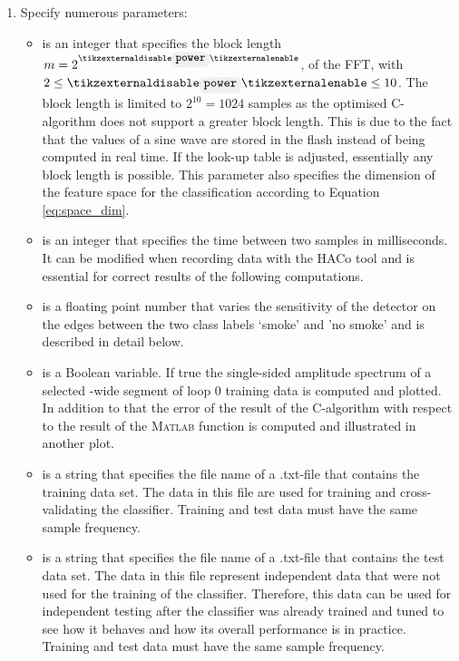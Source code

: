 \begin{enumerate}
\item Specify numerous parameters:

\begin{itemize}

\item {} is an integer that specifies the block length $m = 2^{\small\code{power}}$, of the FFT, with $2 \leq {\code{power}} \leq 10$. The block length is limited to $2^{10} = 1024$ samples as the optimised C-algorithm does not support a greater block length. This is due to the fact that the values of a sine wave are stored in the flash instead of being computed in real time. If the look-up table is adjusted, essentially any block length is possible. This parameter also specifies the dimension of the feature space for the classification according to Equation \ref{eq:space_dim}.

\item {} is an integer that specifies the time between two samples in milliseconds. It can be modified when recording data with the HACo tool and is essential for correct results of the following computations.

\item {} is a floating point number that varies the sensitivity of the detector on the edges between the two class labels `smoke' and 'no smoke' and is described in detail below.

\item {} is a Boolean variable. If true the single-sided amplitude spectrum of a selected -wide segment of loop 0 training data is computed and  plotted. In addition to that the error of the result of the C-algorithm with respect to the result of the \textsc{Matlab}\textsuperscript{\textregistered}  function is computed and illustrated in another plot. 

\item {} is a string that specifies the file name of a .txt-file that contains the training data set. The data in this file are used for training and cross-validating the classifier. Training and test data must have the same sample frequency.

\item {} is a string that specifies the file name of a .txt-file that contains the test data set. The data in this file represent independent data that were not used for the training of the classifier. Therefore, this data can be used for independent testing after the classifier was already trained and tuned to see how it behaves and how its overall performance is in practice. Training and test data must have the same sample frequency.


\end{itemize}
\end{enumerate}
